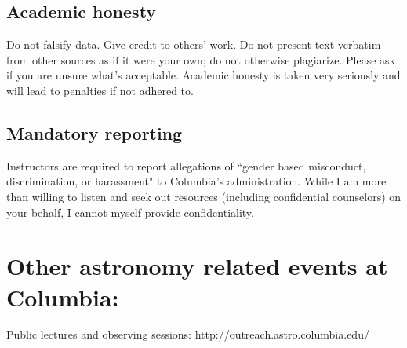 \documentclass[11pt]{article}
\begin{document}
\subsection*{Academic honesty}
Do not falsify data. Give credit to others' work. Do not present text verbatim from other sources as if it
were your own; do not otherwise plagiarize. Please ask if you are unsure what's acceptable. Academic honesty is taken very seriously and will lead to penalties if not adhered to.
 
\subsection*{Mandatory reporting}
Instructors are required to report allegations of ``gender based misconduct, discrimination, or harassment" to Columbia's administration. While I am more than willing to listen and seek out resources (including confidential counselors) on your behalf, I cannot myself provide confidentiality.
 
\section*{Other astronomy related events at Columbia:}
Public lectures and observing sessions: http://outreach.astro.columbia.edu/
\end{document}
